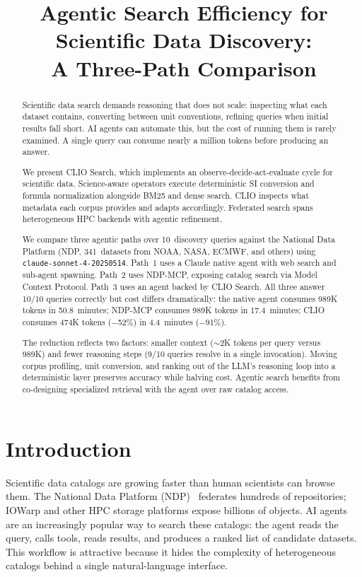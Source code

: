 \documentclass[conference]{IEEEtran}
\title{Agentic Search Efficiency for Scientific Data Discovery:\\
A Three-Path Comparison}
\author{
\IEEEauthorblockN{Shazzadul Islam, Jaime Cernuda, Xian-He Sun, Anthony Kougkas}
\IEEEauthorblockA{Illinois Institute of Technology, Chicago, IL, USA\\
\texttt{sislam6@hawk.illinoistech.edu, \{jcernudagarcia, sun, akougkas\}@illinoistech.edu}}
}
\begin{document}
\maketitle

\begin{abstract}
Scientific data search demands reasoning that does not scale: inspecting
what each dataset contains, converting between unit conventions, refining
queries when initial results fall short. AI agents can automate this,
but the cost of running them is rarely examined. A single query can consume nearly a million tokens before producing
an answer.

We present CLIO Search, which implements an observe-decide-act-evaluate
cycle for scientific data. Science-aware operators execute deterministic
SI conversion and formula normalization alongside BM25 and dense search.
CLIO inspects what metadata each corpus provides and adapts accordingly.
Federated search spans heterogeneous HPC backends with agentic
refinement.

We compare three agentic paths over 10~discovery queries against the
National Data Platform (NDP, 341~datasets from NOAA, NASA, ECMWF, and
others) using \texttt{claude-sonnet-4-20250514}. Path~1 uses a Claude
native agent with web search and sub-agent spawning. Path~2 uses
NDP-MCP, exposing catalog search via Model Context Protocol. Path~3 uses
an agent backed by CLIO Search. All three answer 10/10 queries correctly
but cost differs dramatically: the native agent consumes 989K tokens in
50.8~minutes; NDP-MCP consumes
989K tokens in 17.4~minutes; CLIO consumes 474K tokens ($-$52\%) in
4.4~minutes ($-$91\%).

The reduction reflects two factors: smaller context ($\sim$2K tokens per
query versus 989K) and fewer reasoning steps (9/10 queries resolve in a
single invocation). Moving corpus profiling, unit conversion, and
ranking out of the LLM's reasoning loop into a deterministic layer
preserves accuracy while halving cost. Agentic search benefits from
co-designing specialized retrieval with the agent over raw catalog
access.
\end{abstract}

\section{Introduction}

Scientific data catalogs are growing faster than human scientists can
browse them. The National Data Platform (NDP)~\cite{ndp2024} federates
hundreds of repositories; IOWarp and other HPC storage platforms expose
billions of objects. AI agents are an increasingly popular way to search
these catalogs: the agent reads the query, calls tools, reads results,
and produces a ranked list of candidate datasets. This workflow is
attractive because it hides the complexity of heterogeneous catalogs
behind a single natural-language interface.
\end{document}
